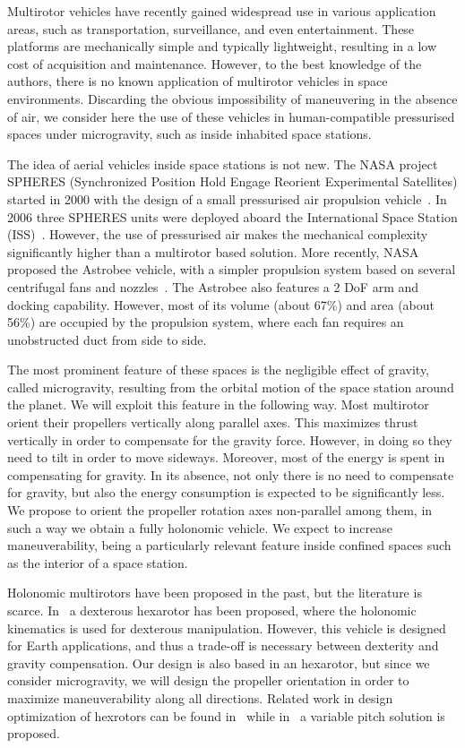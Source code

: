 
Multirotor vehicles have recently gained widespread use in various
application areas, such as transportation, surveillance, and even
entertainment. These platforms are mechanically simple and typically
lightweight, resulting in a low cost of acquisition and
maintenance. However, to the best knowledge of the authors, there is
no known application of multirotor vehicles in space
environments. Discarding the obvious impossibility of maneuvering in
the absence of air, we consider here the use of these vehicles in
human-compatible pressurised spaces under microgravity, such as inside
inhabited space stations.

The idea of aerial vehicles inside space stations is not new. The NASA
project SPHERES (Synchronized Position Hold Engage Reorient
Experimental Satellites) started in 2000 with the design of a small
pressurised air propulsion vehicle~\cite{miller00}. In 2006 three
SPHERES units were deployed aboard the International Space Station
(ISS)~\cite{nolet07}.  However, the use of pressurised air makes the
mechanical complexity significantly higher than a multirotor based
solution.  More recently, NASA proposed the Astrobee vehicle, with a
simpler propulsion system based on several centrifugal fans and
nozzles~\cite{bualat15}. The Astrobee also features a 2 DoF arm and
docking capability. However, most of its volume (about 67\%) and
area (about 56\%) are occupied by the propulsion system, where each
fan requires an unobstructed duct from side to side.

The most prominent feature of these spaces is the negligible effect of
gravity, called microgravity, resulting from the orbital motion of the
space station around the planet.
We will exploit this feature in
the following way. Most multirotor orient their propellers
vertically along parallel axes. This maximizes thrust vertically in
order to compensate for the gravity force. However, in doing so they
need to tilt in order to move sideways. Moreover, most of the energy
is spent in compensating for gravity. In its absence, not
only there is no need to compensate for gravity, but also the
energy consumption is expected to be significantly less. We propose
to orient the propeller rotation axes non-parallel among them, in
such a way we obtain a fully holonomic vehicle. We expect to
increase maneuverability, being a particularly relevant feature inside
confined spaces such as the interior of a space station.

Holonomic multirotors have been proposed in the past, but the
literature is scarce. In~\cite{jiang13,voyles12} a dexterous
hexarotor has been proposed, where the holonomic kinematics is
used for dexterous manipulation. However, this vehicle is designed for
Earth applications, and thus a trade-off is necessary between dexterity
and gravity compensation. Our design is also based in an hexarotor,
but since we consider microgravity, we will design the propeller
orientation in order to maximize maneuverability along all
directions. Related work in design optimization of hexrotors can be
found in~\cite{rajappa15,kiso15} while in~\cite{langkamp11} a variable
pitch solution is proposed.

